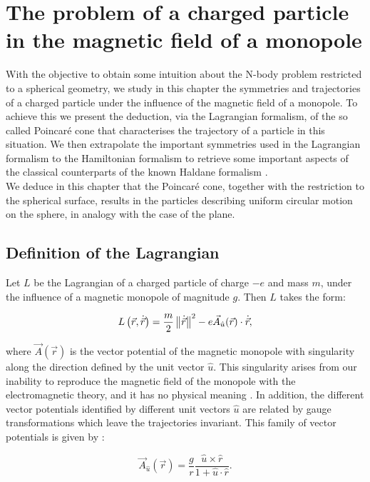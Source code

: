 \chapter{The problem of a charged particle in the magnetic field of a monopole}

With the objective to obtain some intuition about the N-body problem restricted to a spherical geometry, we study in this chapter the symmetries and trajectories of a charged particle under the influence of the magnetic field of a monopole. To achieve this we present the deduction, via the Lagrangian formalism, of the so called Poincar\'e cone \cite{poincare} that characterises the trajectory of a particle in this situation. We then extrapolate the important symmetries used in the Lagrangian formalism to the Hamiltonian formalism to retrieve some important aspects of the classical counterparts of the known Haldane formalism \cite{haldane}.\\

We deduce in this chapter that the Poincar\'e cone, together with the restriction to the spherical surface, results in the particles describing uniform circular motion on the sphere, in analogy with the case of the plane.

\section{Definition of the Lagrangian}
Let $L$ be the Lagrangian of a charged particle of charge $-e$ and mass $m$, under the influence of a magnetic monopole of magnitude $g$. Then $L$ takes the form:

\begin{equation}
L\left( \vec{r},\dot{\vec{r}} \right) = \frac{m}{2}\left\lVert \dot{\vec{r}} \right\rVert^2 - e\vec{A}_{\hat{u}}(\vec{r})\cdot\dot{\vec{r}},
\label{eq:lagrangian}
\end{equation}

where $\vec{A}(\vec{r})$ is the vector potential of the magnetic monopole with singularity along the direction defined by the unit vector $\hat{u}$. This singularity arises from our inability to reproduce the magnetic field of the monopole with the electromagnetic theory, and it has no physical meaning \cite{haldane}. In addition, the different vector potentials identified by different unit vectors $\hat{u}$ are related by gauge transformations which leave the trajectories invariant. This family of vector potentials is given by \cite{vectorPotentials}:

\begin{equation}
\vec{A}_{\hat{u}}(\vec{r}) = \frac{g}{r}\frac{\hat{u}\times\hat{r}}{1+\hat{u}\cdot\hat{r}}.
\label{eq:monopolepotential}
\end{equation}

